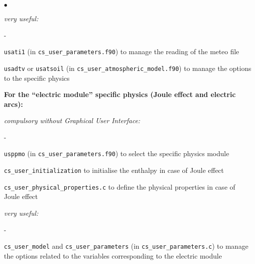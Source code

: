 {{{{{\begin{list}{$\bullet$}{}
\begin{list}{}{}
\begin{list}{}{}
        \item {\em very useful:}
        \begin{list}{-}{}
            \item  \texttt{usati1} (in \texttt{cs\_user\_parameters.f90})
                   to manage the reading of the meteo file
           \item  \texttt{usadtv} or \texttt{usatsoil} (in \texttt{cs\_user\_atmospheric\_model.f90})
                   to manage the options to the specific physics

        \end{list}
    \end{list}


     \item{\bf For the ``electric module'' specific physics
      (Joule effect and electric arcs):}

    \begin{list}{}{}
       \item {\em compulsory without Graphical User Interface:}
        \begin{list}{-}{}
            \item \texttt{usppmo} (in \texttt{cs\_user\_parameters.f90})
                  to select the specific physics module

            \item \texttt{cs\_user\_initialization} to initialise the enthalpy in
                  case of Joule effect

            \item \texttt{cs\_user\_physical\_properties.c}
                  to define the physical
                  properties in case of Joule effect
        \end{list}

        \item {\em very useful:}
        \begin{list}{-}{}
            \item  \texttt{cs\_user\_model} and \texttt{cs\_user\_parameters} (in \texttt{cs\_user\_parameters.c})
                   to manage the options related
                   to the variables corresponding to the electric module

        \end{list}
    \end{list}




\end{list}
\end{list}}}}}}
